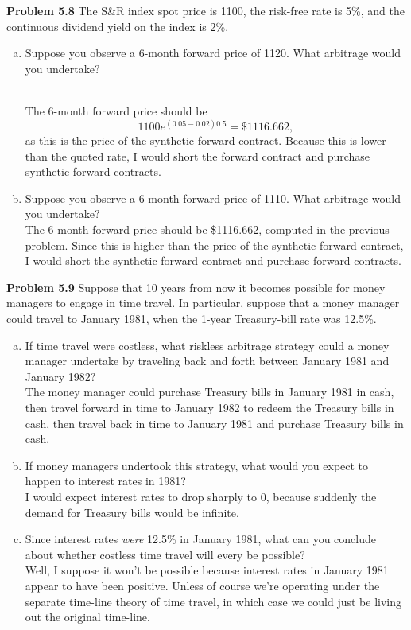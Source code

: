 \documentclass[12pt]{article}
\newcommand{\problem}[1]{\bigskip \noindent \textbf{Problem #1}}
\theoremstyle{plain}
\begin{document}
\problem{5.8} The S\&R index spot price is 1100, the risk-free rate is 5\%, and the continuous dividend yield on the index is 2\%.
\begin{enumerate}[(a)]
\item Suppose you observe a 6-month forward price of 1120. What arbitrage would you undertake?\\\

The 6-month forward price should be
\[
1100 e^{(0.05-0.02)0.5} = \$1116.662,
\]
as this is the price of the synthetic forward contract. Because this is lower than the quoted rate, I would short the forward contract and purchase synthetic forward contracts.

\item Suppose you observe a 6-month forward price of 1110. What arbitrage would you undertake?\\

The 6-month forward price should be \$1116.662, computed in the previous problem. Since this is higher than the price of the synthetic forward contract, I would short the synthetic forward contract and purchase forward contracts.
\end{enumerate}

\problem{5.9} Suppose that 10 years from now it becomes possible for money managers to engage in time travel. In particular, suppose that a money manager could travel to January 1981, when the 1-year Treasury-bill rate was 12.5\%.
\begin{enumerate}[(a)]
\item If time travel were costless, what riskless arbitrage strategy could a money manager undertake by traveling back and forth between January 1981 and January 1982?\\

The money manager could purchase Treasury bills in January 1981 in cash, then travel forward in time to January 1982 to redeem the Treasury bills in cash, then travel back in time to January 1981 and purchase Treasury bills in cash.

\item If money managers undertook this strategy, what would you expect to happen to interest rates in 1981?\\

I would expect interest rates to drop sharply to 0, because suddenly the demand for Treasury bills would be infinite.

\item Since interest rates \emph{were} 12.5\% in January 1981, what can you conclude about whether costless time travel will every be possible?\\

Well, I suppose it won't be possible because interest rates in January 1981 appear to have been positive. Unless of course we're operating under the separate time-line theory of time travel, in which case we could just be living out the original time-line.
\end{enumerate}
\end{document}
